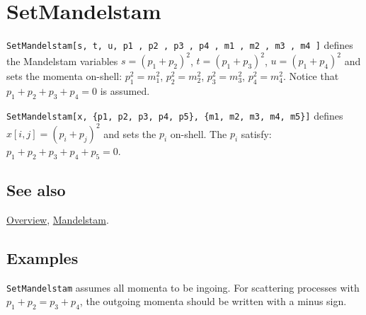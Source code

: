 \documentclass[../FeynCalcManual.tex]{subfiles}
\begin{document}
\hypertarget{setmandelstam}{
\section{SetMandelstam}\label{setmandelstam}}

\texttt{SetMandelstam[\allowbreak{}s,\ \allowbreak{}t,\ \allowbreak{}u,\ \allowbreak{}p1 ,\ \allowbreak{}p2 ,\ \allowbreak{}p3 ,\ \allowbreak{}p4 ,\ \allowbreak{}m1 ,\ \allowbreak{}m2 ,\ \allowbreak{}m3 ,\ \allowbreak{}m4 ]}
defines the Mandelstam variables \(s=(p_1+p_2)^2\), \(t=(p_1+p_3)^2\),
\(u=(p_1+p_4)^2\) and sets the momenta on-shell: \(p_1^2=m_1^2\),
\(p_2^2=m_2^2\), \(p_3^2=m_3^2\), \(p_4^2=m_4^2\). Notice that
\(p_1+p_2+p_3+p_4=0\) is assumed.

\texttt{SetMandelstam[\allowbreak{}x,\ \allowbreak{}\{\allowbreak{}p1,\ \allowbreak{}p2,\ \allowbreak{}p3,\ \allowbreak{}p4,\ \allowbreak{}p5\},\ \allowbreak{}\{\allowbreak{}m1,\ \allowbreak{}m2,\ \allowbreak{}m3,\ \allowbreak{}m4,\ \allowbreak{}m5\}]}
defines \(x[i, j] = (p_i+p_j)^2\) and sets the \(p_i\) on-shell. The
\(p_i\) satisfy: \(p_1 + p_2 + p_3 + p_4 + p_5 = 0\).

\subsection{See also}

\hyperlink{toc}{Overview}, \hyperlink{mandelstam}{Mandelstam}.

\subsection{Examples}

\texttt{SetMandelstam} assumes all momenta to be ingoing. For scattering
processes with \(p_1+p_2=p_3+p_4\), the outgoing momenta should be
written with a minus sign.

\begin{Shaded}
\begin{Highlighting}[]
\OperatorTok{[]} 
 
\OperatorTok{[}\OperatorTok{,} \OperatorTok{,} \OperatorTok{,}\OperatorTok{,}\OperatorTok{,} \SpecialCharTok{{-}}\OperatorTok{,} \SpecialCharTok{{-}}\OperatorTok{,}\OperatorTok{,}\OperatorTok{,}\OperatorTok{,}\OperatorTok{]}\NormalTok{; }
 
\OperatorTok{[}\OperatorTok{,}\OperatorTok{]} 
 
\OperatorTok{[}\OperatorTok{,}\OperatorTok{]} 
 
\OperatorTok{[}\OperatorTok{,}\OperatorTok{]}
\end{Highlighting}
\end{Shaded}
\end{document}
